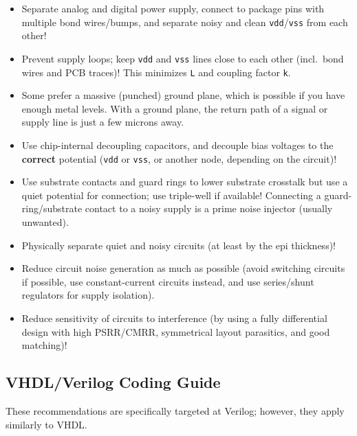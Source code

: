 \documentclass[
  a4paper,
  DIV=11,
  numbers=noendperiod]{scrartcl}
\providecommand{\tightlist}{%
  \setlength{\itemsep}{0pt}\setlength{\parskip}{0pt}}\usepackage{longtable,booktabs,array}
\begin{document}
\begin{itemize}
\tightlist
\item
  Separate analog and digital power supply, connect to package pins with
  multiple bond wires/bumps, and separate noisy and clean
  \texttt{vdd}/\texttt{vss} from each other!
\item
  Prevent supply loops; keep \texttt{vdd} and \texttt{vss} lines close
  to each other (incl.~bond wires and PCB traces)! This minimizes
  \texttt{L} and coupling factor \texttt{k}.
\item
  Some prefer a massive (punched) ground plane, which is possible if you
  have enough metal levels. With a ground plane, the return path of a
  signal or supply line is just a few microns away.
\item
  Use chip-internal decoupling capacitors, and decouple bias voltages to
  the \textbf{correct} potential (\texttt{vdd} or \texttt{vss}, or
  another node, depending on the circuit)!
\item
  Use substrate contacts and guard rings to lower substrate crosstalk
  but use a quiet potential for connection; use triple-well if
  available! Connecting a guard-ring/substrate contact to a noisy supply
  is a prime noise injector (usually unwanted).
\item
  Physically separate quiet and noisy circuits (at least by the epi
  thickness)!
\item
  Reduce circuit noise generation as much as possible (avoid switching
  circuits if possible, use constant-current circuits instead, and use
  series/shunt regulators for supply isolation).
\item
  Reduce sensitivity of circuits to interference (by using a fully
  differential design with high PSRR/CMRR, symmetrical layout
  parasitics, and good matching)!
\end{itemize}

\subsection{VHDL/Verilog Coding Guide}\label{vhdlverilog-coding-guide}

These recommendations are specifically targeted at Verilog; however,
they apply similarly to VHDL.
\end{document}

